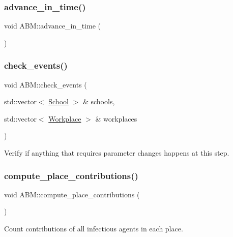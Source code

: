 \subsubsection{\texorpdfstring{advance\+\_\+in\+\_\+time()}{advance\_in\_time()}}
{\footnotesize\ttfamily void A\+B\+M\+::advance\+\_\+in\+\_\+time (\begin{DoxyParamCaption}{ }\end{DoxyParamCaption})\hspace{0.3cm}{\ttfamily [inline]}}

\mbox{\label{classABM_a29f628a1b72cab12a2e5d6ebe7f4c6c8}} 
\subsubsection{\texorpdfstring{check\+\_\+events()}{check\_events()}}
{\footnotesize\ttfamily void A\+B\+M\+::check\+\_\+events (\begin{DoxyParamCaption}\item[{std\+::vector$<$ \hyperlink{classSchool}{School} $>$ \&}]{schools,  }\item[{std\+::vector$<$ \hyperlink{classWorkplace}{Workplace} $>$ \&}]{workplaces }\end{DoxyParamCaption})}



Verify if anything that requires parameter changes happens at this step. 

\mbox{\label{classABM_a9f2c80f84bf116c3444df95f34ead1dc}} 
\subsubsection{\texorpdfstring{compute\+\_\+place\+\_\+contributions()}{compute\_place\_contributions()}}
{\footnotesize\ttfamily void A\+B\+M\+::compute\+\_\+place\+\_\+contributions (\begin{DoxyParamCaption}{ }\end{DoxyParamCaption})}



Count contributions of all infectious agents in each place. 

